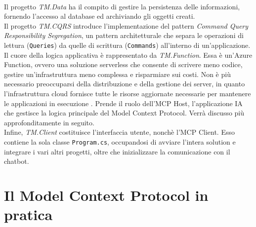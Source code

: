 \\
Il progetto \textit{TM.Data} ha il compito di gestire la persistenza delle informazioni, fornendo l'accesso al database 
ed archiviando gli oggetti creati.
\\
Il progetto \textit{TM.CQRS} introduce l'implementazione del pattern \textit{Command Query Responsibility Segregation}, un pattern 
architetturale che separa le operazioni di lettura (\texttt{Queries}) da quelle di scrittura (\texttt{Commands}) all'interno di un'applicazione. 
\\
Il cuore della logica applicativa è rappresentato da \textit{TM.Function}. Essa è un'Azure Function, ovvero una soluzione serverless 
che consente di scrivere meno codice, gestire un'infrastruttura meno complessa e risparmiare sui costi. Non è più necessario preoccuparsi 
della distribuzione e della gestione dei server, in quanto l'infrastruttura cloud fornisce tutte le risorse aggiornate necessarie per mantenere 
le applicazioni in esecuzione \cite{azurefunctions_msdocs}. Prende il ruolo dell'MCP Host, l'applicazione IA che gestisce la logica principale del
Model Context Protocol. Verrà discusso più approfonditamente in seguito. 
\\
Infine, \textit{TM.Client} costituisce l'interfaccia utente, nonchè l'MCP Client. Esso contiene la sola classe \texttt{Program.cs}, occupandosi
di avviare l'intera solution e integrare i vari altri progetti, oltre che inizializzare la comunicazione con il chatbot.

\section{Il Model Context Protocol in pratica}

